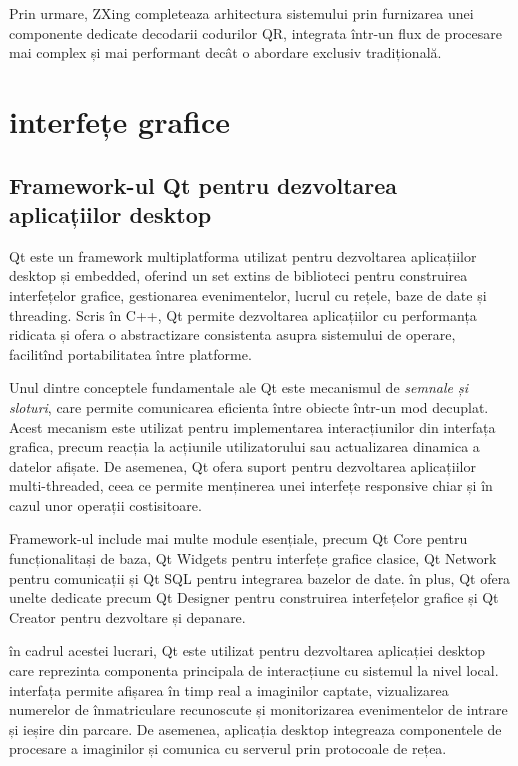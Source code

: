 Prin urmare, ZXing completeaza arhitectura sistemului prin furnizarea unei componente dedicate decodarii codurilor QR, integrata într-un flux de procesare mai complex și mai performant decât o abordare exclusiv tradițională.

\section{interfețe grafice}

\subsection*{Framework-ul Qt pentru dezvoltarea aplicațiilor desktop}

Qt este un framework multiplatforma utilizat pentru dezvoltarea aplicațiilor desktop și embedded, oferind un set extins de biblioteci pentru construirea interfețelor grafice, gestionarea evenimentelor, lucrul cu rețele, baze de date și threading. Scris în C++, Qt permite dezvoltarea aplicațiilor cu performanța ridicata și ofera o abstractizare consistenta asupra sistemului de operare, facilitînd portabilitatea între platforme.

Unul dintre conceptele fundamentale ale Qt este mecanismul de \textit{semnale și sloturi}, care permite comunicarea eficienta între obiecte într-un mod decuplat. Acest mecanism este utilizat pentru implementarea interacțiunilor din interfața grafica, precum reacția la acțiunile utilizatorului sau actualizarea dinamica a datelor afișate. De asemenea, Qt ofera suport pentru dezvoltarea aplicațiilor multi-threaded, ceea ce permite menținerea unei interfețe responsive chiar și în cazul unor operații costisitoare.

Framework-ul include mai multe module esențiale, precum Qt Core pentru funcționalitași de baza, Qt Widgets pentru interfețe grafice clasice, Qt Network pentru comunicații și Qt SQL pentru integrarea bazelor de date. în plus, Qt ofera unelte dedicate precum Qt Designer pentru construirea interfețelor grafice și Qt Creator pentru dezvoltare și depanare.

în cadrul acestei lucrari, Qt este utilizat pentru dezvoltarea aplicației desktop care reprezinta componenta principala de interacțiune cu sistemul la nivel local. interfața permite afișarea în timp real a imaginilor captate, vizualizarea numerelor de înmatriculare recunoscute și monitorizarea evenimentelor de intrare și ieșire din parcare. De asemenea, aplicația desktop integreaza componentele de procesare a imaginilor și comunica cu serverul prin protocoale de rețea.

